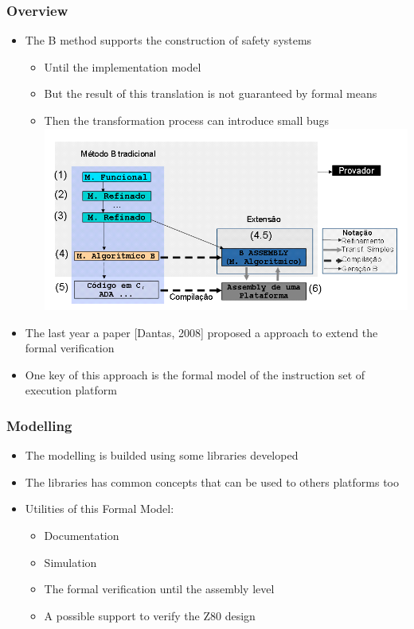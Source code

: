 \begin{frame}
\frametitle{Overview}  

\begin{itemize}[<+->]
  \item The B method supports the construction of safety systems
  \begin{itemize}
    \item Until the implementation model
    \item But the result of this translation is not guaranteed by formal means
    \item Then the transformation process can introduce small bugs\\
       \includegraphics[width=.7\textwidth]{figures/passos_de_desenvolvimento_extendido.png}
  \end{itemize}
  \item The last year a paper [Dantas, 2008] proposed a approach to extend the formal verification
  \item One key of this approach is the formal model of the instruction set  of execution platform %
\end{itemize}

\end{frame}


\begin{frame}
\frametitle{Modelling}  

\begin{itemize}[<+->]
  \item The modelling is builded using some libraries developed
  \item The libraries has common concepts that can be used to others platforms too
  \item Utilities of this Formal Model:
  \begin{itemize}
    \item Documentation
    \item Simulation
    \item The formal verification until the assembly level
    \item A possible support to verify the Z80 design

  \end{itemize}
\end{itemize}

\end{frame}



